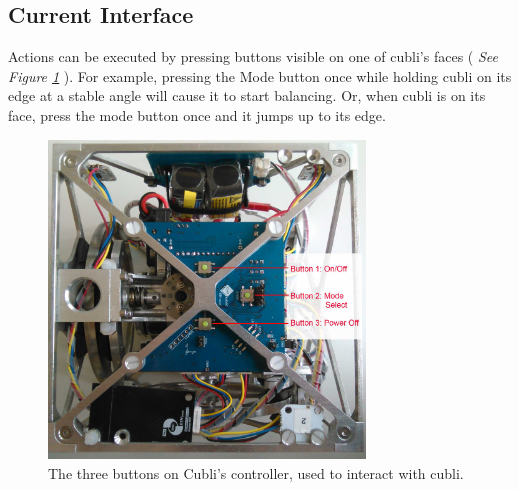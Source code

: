 \subsection{Current Interface}

Actions can be executed by pressing buttons visible on one of cubli's faces ( \textit{See Figure \ref{img:Buttons}} ). For example, pressing the Mode button once while holding cubli on its edge at a stable angle will cause it to start balancing. Or, when cubli is on its face, press the mode button once and it jumps up to its edge.\\

\begin{figure}[ht]
   \centering
   \includegraphics[width=0.75\textwidth]{img/Buttons.jpg}
   \caption{The three buttons on Cubli's controller, used to interact with cubli.}
   \label{img:Buttons}
\end{figure}




